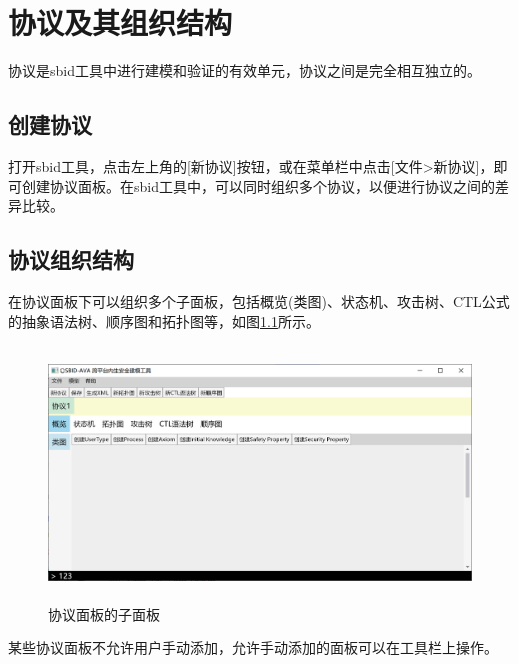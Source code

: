 \chapter{协议及其组织结构}

协议是sbid工具中进行建模和验证的有效单元，协议之间是完全相互独立的。

\section{创建协议}
打开sbid工具，点击左上角的[新协议]按钮，或在菜单栏中点击[文件>新协议]，即可创建协议面板。在sbid工具中，可以同时组织多个协议，以便进行协议之间的差异比较。

\section{协议组织结构}
在协议面板下可以组织多个子面板，包括概览(类图)、状态机、攻击树、CTL公式的抽象语法树、顺序图和拓扑图等，如图\ref{protocol_subpanels}所示。
\par
\begin{figure}[h]
	\centering
	\includegraphics[width=12cm,height=6.75cm]{imgs/protocol_subpanels.png}
	\caption{协议面板的子面板}
	\label{protocol_subpanels}
\end{figure}
\par
某些协议面板不允许用户手动添加，允许手动添加的面板可以在工具栏上操作。
